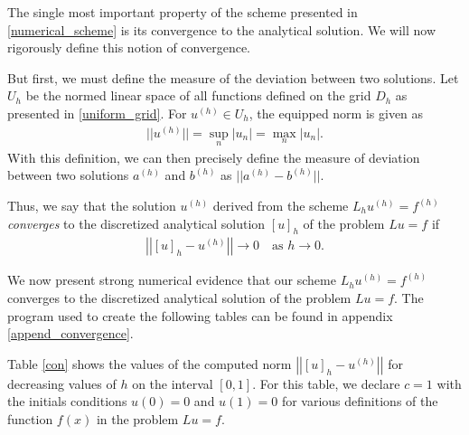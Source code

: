 The single most important property of the scheme presented in
\eqref{numerical_scheme} is its convergence to the analytical solution. We will
now rigorously define this notion of convergence.

But first, we must define the measure of the deviation between two solutions.
Let $U_h$ be the normed linear space of all functions defined on the grid $D_h$
as presented in \eqref{uniform_grid}. For $u^{(h)} \in U_h$, the equipped norm is
given as
\begin{align}\label{norm}
  ||u^{(h)}|| = \sup_n |u_n| = \max_n |u_n|.
\end{align}
With this definition, we can then precisely define the measure of deviation
between two solutions $a^{(h)}$ and $b^{(h)}$ as $||a^{(h)} - b^{(h)}||$.

Thus, we say that the solution $u^{(h)}$ derived from the
scheme $L_h u^{(h)} = f^{(h)}$ \textit{converges} to the discretized analytical
solution $[u]_h$ of the problem $Lu = f$ if
\begin{align}\label{convergence_def}
  \left|\left|[u]_h - u^{(h)}\right|\right| \to 0 \quad \text{as $h \to 0$}.
\end{align}

We now present strong numerical evidence that our scheme $L_h u^{(h)} = f^{(h)}$
converges to the discretized analytical solution of the problem $Lu = f$. The
program used to create the following tables can be found in appendix \ref{append_convergence}.

Table \ref{con} shows the values of the computed norm $\left|\left|[u]_h - u^{(h)}\right|\right|$ for
decreasing values of $h$ on the interval $[0, 1]$. For this table, we declare $c=1$ with the
initials conditions $u(0) = 0$ and $u(1) = 0$ for various definitions of
the function $f(x)$ in the problem $Lu = f$.


